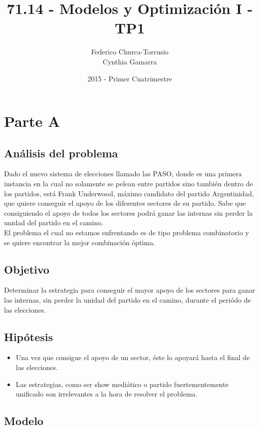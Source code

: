 \documentclass[10pt, a4paper, titlepage,
	oneside,
	fleqn, leqno]{article}
\title{71.14 - Modelos y Optimización I - TP1}
\author{
	Federico Churca-Torrusio\\
	Cynthia Gamarra}
\date{2015 - Primer Cuatrimestre}
\let\oldsection\section
\def\section{\cleardoublepage\oldsection}
\begin{document}
\maketitle
\thispagestyle{empty}
\cleardoublepage

\setcounter{page}{1}

\section{Parte A}

\subsection{Análisis del problema}
Dado el nuevo sistema de elecciones llamado las PASO, donde es una primera instancia en la cual no solamente se pelean entre partidos sino también dentro de los partidos, está Frank Underwood, máximo candidato del partido Argentinidad, que quiere conseguir el apoyo de los diferentes sectores de su partido. Sabe que consiguiendo el apoyo de todos los sectores podrá ganar las internas sin perder la unidad del partido en el camino.\\
El problema el cual no estamos enfrentando es de tipo problema combinatorio y se quiere encontrar la mejor combinación óptima.
\subsection{Objetivo}
Determinar la estrategia para conseguir el mayor apoyo de los sectores para ganar las internas, sin perder la unidad del partido en el camino, durante el periódo de las elecciones.

\subsection{Hipótesis}
\begin{itemize}
 \item Una vez que consigue el apoyo de un sector, éste lo apoyará hasta el final de las elecciones.
 \item Las estrategias, como ser show mediático o partido fuertementemente unificado son irrelevantes a la hora de resolver el problema.
\end{itemize}
\subsection{Modelo}
\end{document}
